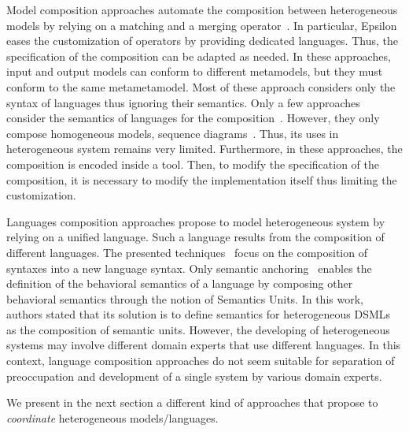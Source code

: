 Model composition approaches automate the composition between heterogeneous models by relying on a matching and a merging operator~\cite{mergemanifest,epsilon,kompose}. In particular, Epsilon~\cite{epsilon} eases the customization of operators by providing dedicated languages. Thus, the specification of the composition can be adapted as needed. In these approaches, input and output models can conform to different metamodels, but they must conform to the same metametamodel. Most of these approach considers only the syntax of languages thus ignoring their semantics. Only a few approaches consider the semantics of languages for the composition~\cite{sequenceweavingbib,rambib,composdbib}. However, they only compose homogeneous models, \ie sequence diagrams~\cite{rambib}. Thus, its uses in heterogeneous system remains very limited. Furthermore, in these approaches, the composition is encoded inside a tool. Then, to modify the specification of the composition, it is necessary to modify the implementation itself thus limiting the customization. 

Languages composition approaches propose to model heterogeneous system by relying on a unified language. Such a language results from the composition of different languages. The presented techniques~\cite{metamodelcompo} focus on the composition of syntaxes into a new language syntax. Only semantic anchoring~\cite{semanticsanchoring} enables the definition of the behavioral semantics of a language by composing other behavioral semantics through the notion of Semantics Units. In this work, authors stated that its solution is to define semantics for heterogeneous DSMLs as the composition of semantic units. However, the developing of heterogeneous systems may involve different domain experts that use different languages. In this context, language composition approaches do not seem suitable for separation of preoccupation and development of a single system by various domain experts.

We present in the next section a different kind of approaches that propose to \emph{coordinate} heterogeneous models/languages. 



